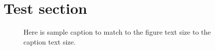 \documentclass[aps,prb,twocolumn,superscriptaddress,amsmath]{revtex4-2}
\begin{document}
%
\section{Test section}


\begin{figure}[h]
    \centering
    
    \caption{Here is sample caption to match to the figure text size to the caption text size.}
\end{figure}
\end{document}

